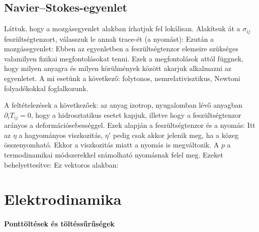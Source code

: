    
  \subsection{Navier--Stokes-egyenlet}
   
   Láttuk, hogy a mozgásegyenlet  alakban írhatjuk fel lokálisan. Alakítsuk át a $\sigma_{ij}$ feszültségtenzort, válasszuk le annak trace-ét (a nyomást):
   Ezután a mozgásegyenlet:
   Ebben az egyenletben a feszültségtenzor elemeire szükséges valamilyen fizikai megfontolásokat tenni. Ezek a megfontolások attól függnek, hogy milyen anyagra és milyen körülmények között akarjuk alkalmazni az egyenletet. A mi esetünk a következő: folytonos, nemrelativisztikus, Newtoni folyadékokkal foglalkozunk.
   
   A feltételezések a következőek: az anyag izotrop, nyugalomban lévő anyagban $\partial_i T_{ij}=0$, hogy a hidrosztatikus esetet kapjuk, illetve hogy a feszültségtenzor arányos a deformációsebességgel. Ezek alapján a feszültségtenzor és a nyomás:
   Itt az $\eta$ a hagyományos viszkozitás, $\eta'$ pedig csak akkor jelenik meg, ha a közeg összenyomható. Ekkor a viszkozitás miatt a nyomás is megváltozik. A $p$ a termodinamikai módszerekkel számolható nyomásnak felel meg. Ezeket behelyettesítve:
   Ez vektoros alakban:
    
 \section{Elektrodinamika}
 
  \paragraph{Ponttöltések és töltéssűrűségek}
   
